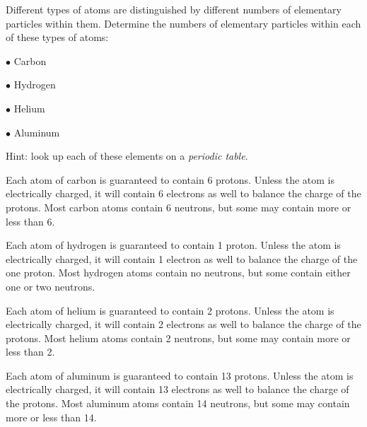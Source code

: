 

Different types of atoms are distinguished by different numbers of elementary particles within them.  Determine the numbers of elementary particles within each of these types of atoms:

\vskip 10pt

\item {$\bullet$} Carbon
\item {$\bullet$} Hydrogen
\item {$\bullet$} Helium
\item {$\bullet$} Aluminum

\vskip 10pt

Hint: look up each of these elements on a {\it periodic table}.







Each atom of carbon is guaranteed to contain 6 protons.  Unless the atom is electrically charged, it will contain 6 electrons as well to balance the charge of the protons.  Most carbon atoms contain 6 neutrons, but some may contain more or less than 6. 

\vskip 5pt

Each atom of hydrogen is guaranteed to contain 1 proton.  Unless the atom is electrically charged, it will contain 1 electron as well to balance the charge of the one proton.  Most hydrogen atoms contain no neutrons, but some contain either one or two neutrons.
 
\vskip 5pt

Each atom of helium is guaranteed to contain 2 protons.  Unless the atom is electrically charged, it will contain 2 electrons as well to balance the charge of the protons.  Most helium atoms contain 2 neutrons, but some may contain more or less than 2.

\vskip 5pt

Each atom of aluminum is guaranteed to contain 13 protons.  Unless the atom is electrically charged, it will contain 13 electrons as well to balance the charge of the protons.  Most aluminum atoms contain 14 neutrons, but some may contain more or less than 14.

\vskip 10pt

